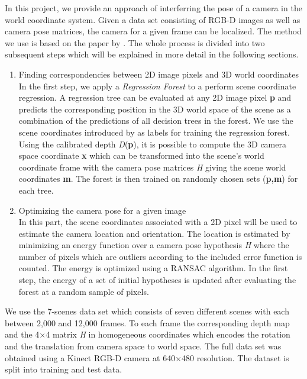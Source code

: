 \documentclass[final]{cvpr}
\begin{document}
In this project, we provide an approach of interferring the pose of a camera in the world coordinate system. Given a data set consisting of RGB-D images as well as camera pose matrices, the camera for a given frame can be localized. The method we use is based on the paper by \cite{shotton2013}.  The whole process is divided into two subsequent steps which will be explained in more detail in the following sections.
\begin{enumerate}
\item Finding correspondencies between 2D image pixels and 3D world coordinates  \\

In the first step, we apply a \textit{Regression Forest} to a perform scene coordinate regression. A regression tree can be evaluated at any 2D image pixel \textbf{p} and predicts the corresponding position in the 3D world space of the scene as a combination of the predictions of all decision trees in the forest. We use the scene coordinates introduced by \cite{shotton2013} as labels for training the regression forest. Using the calibrated depth \textit{D}(\textbf{p}), it is possible to compute the 3D camera space coordinate \textbf{x} which can be transformed into the scene's world coordinate frame with the camera pose matrices \textit{H} giving  the scene world coordinates \textbf{m}. The forest is then trained on randomly chosen sets (\textbf{p,m}) for each tree.

\item Optimizing the camera pose for a given image \\
In this part, the scene coordinates associated with a 2D pixel will be used to estimate the camera location and orientation. The location is estimated by minimizing an energy function over a camera pose hypothesis \textit{H} where the number of pixels which are outliers according to the included error function is counted. The energy is optimized using a RANSAC algorithm. In the first step, the energy of a set of initial hypotheses is updated after evaluating the forest at a random sample of pixels.
\end{enumerate}
    
    


We use the 7-scenes data set which consists of seven different scenes with each between 2,000 and 12,000 frames. To each frame the corresponding depth map and the 4×4 matrix \textit{H} in homogeneous coordinates which encodes the rotation and the translation from camera space to world space. The full data set was obtained using a Kinect RGB-D camera at 640×480 resolution. The dataset is split into training and test data.
\end{document}
